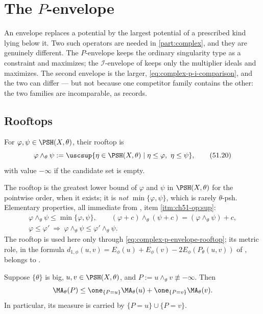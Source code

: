 \section{The \texorpdfstring{$P$}{P}-envelope}
\label{sec:ch51-p-envelope}

An envelope replaces a potential by the largest potential of a prescribed
kind lying below it.  Two such operators are needed in
\cref{part:complex}, and they are genuinely different.  The
$P$-envelope keeps the ordinary singularity type as a constraint and
maximizes; the $\mathcal I$-envelope of 
keeps only the multiplier ideals and maximizes.  The second envelope is the
larger, \eqref{eq:complex-p-i-comparison}, and the two can differ --- but
not because one competitor family contains the other: the two families are
incomparable, as  records.

\subsection{Rooftops}
\label{sec:ch51-rooftop}

For $\varphi,\psi\in\PSH(X,\theta)$, their rooftop is
\[
 \varphi\wedge_\theta\psi
 :=\uscsup\{\eta\in\PSH(X,\theta)\mid
             \eta\leq\varphi,\ \eta\leq\psi\},
\tag{51.20}\label{eq:complex-rooftop}
\]
with value $-\infty$ if the candidate set is empty.

The rooftop is the greatest lower bound of $\varphi$ and $\psi$ in
$\PSH(X,\theta)$ for the pointwise order, when it exists; it is
\emph{not} $\min\{\varphi,\psi\}$, which is rarely $\theta$-psh.
Elementary properties, all immediate from
, item \cref{itm:ch51-op:sup}:
\[
 \begin{gathered}
 \varphi\wedge_\theta\psi\leq\min\{\varphi,\psi\},
 \qquad
 (\varphi+c)\wedge_\theta(\psi+c)=(\varphi\wedge_\theta\psi)+c,\\
 \varphi\leq\varphi'\ \Longrightarrow\
 \varphi\wedge_\theta\psi\leq\varphi'\wedge_\theta\psi .
 \end{gathered}
\]
The rooftop is used here only through
\eqref{eq:complex-p-envelope-rooftop}; its metric role, in the formula
$d_{1,\phi}(u,v)=E_\phi(u)+E_\phi(v)-2E_\phi(P_\theta(u,v))$ of
, belongs to .

\begin{lemma}\label{lem:ch51-rooftop-contact}
Suppose $\{\theta\}$ is big, $u,v\in\PSH(X,\theta)$, and
$P:=u\wedge_\theta v\not\equiv-\infty$.  Then
\[
 \MA_\theta(P)\leq
 \one_{\{P=u\}}\MA_\theta(u)+\one_{\{P=v\}}\MA_\theta(v).
\]
In particular, its measure is carried by $\{P=u\}\cup\{P=v\}$.
\end{lemma}

